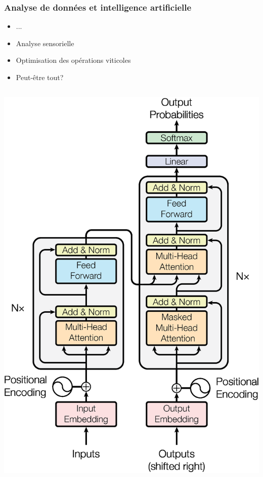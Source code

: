 \documentclass{beamer}
\begin{document}
\begin{frame}
	\frametitle{Analyse de données et intelligence artificielle}
	\begin{itemize}
		\item ...
		\item Analyse sensorielle
		\item Optimisation des opérations viticoles
		\item Peut-être tout?
	\end{itemize}
	
	\begin{columns}[c]
		\centering
		\includegraphics[width=\textwidth]{transformer}
		\centering

\end{columns}
\end{frame}
\end{document}
